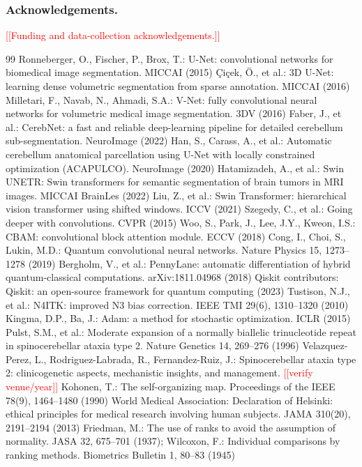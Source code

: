 \documentclass[runningheads]{llncs}
\newcommand{\todo}[1]{\textcolor{red}{[[#1]]}}
\begin{document}
\subsubsection*{Acknowledgements.} \todo{Funding and data-collection acknowledgements.}

\begin{thebibliography}{99}
 Ronneberger, O., Fischer, P., Brox, T.: U-Net: convolutional networks for biomedical image segmentation. MICCAI (2015)
 \c{C}i\c{c}ek, \"O., et al.: 3D U-Net: learning dense volumetric segmentation from sparse annotation. MICCAI (2016)
 Milletari, F., Navab, N., Ahmadi, S.A.: V-Net: fully convolutional neural networks for volumetric medical image segmentation. 3DV (2016)
 Faber, J., et al.: CerebNet: a fast and reliable deep-learning pipeline for detailed cerebellum sub-segmentation. NeuroImage (2022)
 Han, S., Carass, A., et al.: Automatic cerebellum anatomical parcellation using U-Net with locally constrained optimization (ACAPULCO). NeuroImage (2020)
 Hatamizadeh, A., et al.: Swin UNETR: Swin transformers for semantic segmentation of brain tumors in MRI images. MICCAI BrainLes (2022)
 Liu, Z., et al.: Swin Transformer: hierarchical vision transformer using shifted windows. ICCV (2021)
 Szegedy, C., et al.: Going deeper with convolutions. CVPR (2015)
 Woo, S., Park, J., Lee, J.Y., Kweon, I.S.: CBAM: convolutional block attention module. ECCV (2018)
 Cong, I., Choi, S., Lukin, M.D.: Quantum convolutional neural networks. Nature Physics 15, 1273--1278 (2019)
 Bergholm, V., et al.: PennyLane: automatic differentiation of hybrid quantum-classical computations. arXiv:1811.04968 (2018)
 Qiskit contributors: Qiskit: an open-source framework for quantum computing (2023)
 Tustison, N.J., et al.: N4ITK: improved N3 bias correction. IEEE TMI 29(6), 1310--1320 (2010)
 Kingma, D.P., Ba, J.: Adam: a method for stochastic optimization. ICLR (2015)
 Pulst, S.M., et al.: Moderate expansion of a normally biallelic trinucleotide repeat in spinocerebellar ataxia type 2. Nature Genetics 14, 269--276 (1996)
 Velazquez-Perez, L., Rodriguez-Labrada, R., Fernandez-Ruiz, J.: Spinocerebellar ataxia type 2: clinicogenetic aspects, mechanistic insights, and management. \todo{verify venue/year}
 Kohonen, T.: The self-organizing map. Proceedings of the IEEE 78(9), 1464--1480 (1990)
 World Medical Association: Declaration of Helsinki: ethical principles for medical research involving human subjects. JAMA 310(20), 2191--2194 (2013)
 Friedman, M.: The use of ranks to avoid the assumption of normality. JASA 32, 675--701 (1937); Wilcoxon, F.: Individual comparisons by ranking methods. Biometrics Bulletin 1, 80--83 (1945)
\end{thebibliography}
\end{document}
